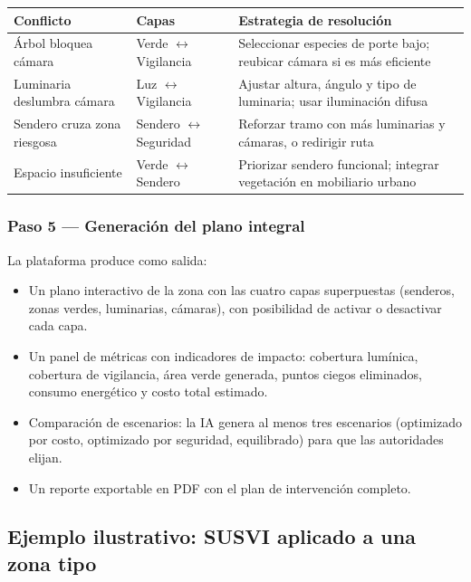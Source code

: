 \documentclass[12pt,a4paper]{article}
\begin{document}
\begin{table}[H]
\centering
\small
\begin{tabularx}{\textwidth}{l l X}
\toprule
\textbf{Conflicto} & \textbf{Capas} & \textbf{Estrategia de resolución} \\
\midrule
Árbol bloquea cámara & Verde $\leftrightarrow$ Vigilancia & Seleccionar especies de porte bajo; reubicar cámara si es más eficiente \\
Luminaria deslumbra cámara & Luz $\leftrightarrow$ Vigilancia & Ajustar altura, ángulo y tipo de luminaria; usar iluminación difusa \\
Sendero cruza zona riesgosa & Sendero $\leftrightarrow$ Seguridad & Reforzar tramo con más luminarias y cámaras, o redirigir ruta \\
Espacio insuficiente & Verde $\leftrightarrow$ Sendero & Priorizar sendero funcional; integrar vegetación en mobiliario urbano \\
\bottomrule
\end{tabularx}
\end{table}

\subsubsection{Paso 5 — Generación del plano integral}

La plataforma produce como salida:

\begin{itemize}[leftmargin=1.5cm]
    \item Un plano interactivo de la zona con las cuatro capas superpuestas (senderos, zonas verdes, luminarias, cámaras), con posibilidad de activar o desactivar cada capa.
    \item Un panel de métricas con indicadores de impacto: cobertura lumínica, cobertura de vigilancia, área verde generada, puntos ciegos eliminados, consumo energético y costo total estimado.
    \item Comparación de escenarios: la IA genera al menos tres escenarios (optimizado por costo, optimizado por seguridad, equilibrado) para que las autoridades elijan.
    \item Un reporte exportable en PDF con el plan de intervención completo.
\end{itemize}

\subsection{Ejemplo ilustrativo: SUSVI aplicado a una zona tipo}
\end{document}
